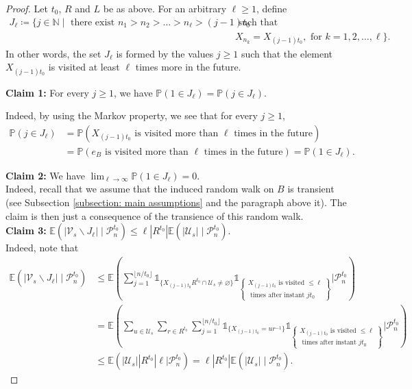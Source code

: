 \documentclass[reqno,oneside,11pt]{amsart}
\renewcommand{\P}{\mathbb{P}}
\newcommand{\E}{\mathbb{E}}
\theoremstyle{plain}
\theoremstyle{definition}
\begin{document}
\begin{proof}
	Let $t_0$, $R$ and $L$ be as above.	For an arbitrary $\ell \ge 1$, define 
	\begin{align*}
		J_{\ell}\coloneqq \{j\in \mathbb{N}\mid \text{ there exist }n_1>n_2>\ldots> n_\ell>(j-1)t_0 &\text{ such that }\\
		&X_{n_k}=X_{(j-1)t_0}, \text{ for }k=1,2,\ldots,\ell \}.
	\end{align*}
	In other words, the set $J_{\ell}$ is formed by the values $j\ge 1$ such that the element $X_{(j-1)t_0}$ is visited at least $\ell$ times more in the future.
	
	\textbf{Claim 1:} For every $j\ge 1$, we have  $\P(1\in J_\ell)=\P(j\in J_\ell)$.
	
	Indeed, by using the Markov property, we see that for every $j\ge 1$,
	\begin{align*}
		\P(j\in J_\ell)&=\P(X_{(j-1)t_0} \text{ is visited more than }\ell \text{ times in the future})\\
		&=\P(e_B \text{ is visited more than }\ell \text{ times in the future})=\P(1\in J_{\ell}).
	\end{align*}
	
	\textbf{Claim 2:} We have $\lim_{\ell \to \infty}\P(1\in J_\ell)=0.$\\
	Indeed, recall that we assume that the induced random walk on $B$ is transient (see Subsection \ref{subsection: main assumptions} and the paragraph above it). The claim is then just a consequence of the transience of this random walk. \\
	
	\textbf{Claim 3:} $\E(|\mathcal{V}_s\backslash J_\ell|\mid \mathcal{P}_n^{t_0})\le \ell |R^{t_0}| \E(|\mathcal{U}_s|\mid \mathcal{P}_n^{t_0})$.\\
	Indeed, note that
	\begin{align*}
		\E\left( |\mathcal{V}_s\backslash J_\ell|\mid \mathcal{P}_n^{t_0} \right)&\le\E\left( \sum_{j=1}^{\lfloor n/t_0\rfloor}\mathds{1}_{\{X_{(j-1)t_0}R^{t_0}\cap \mathcal{U}_s\neq \varnothing\}}\mathds{1}_{\left\{\substack{ X_{(j-1)t_0}\text{ is visited }\le \ell \\ \text{ times after instant }jt_0} \right\} }\Big| \mathcal{P}_n^{t_0} \right)\\
		&=\E\left(\sum_{u\in \mathcal{U}_s}\sum_{r\in R^{t_0}} \sum_{j=1}^{\lfloor n/t_0\rfloor}\mathds{1}_{\{X_{(j-1)t_0}=ur^{-1}\}}\mathds{1}_{\left\{\substack{ X_{(j-1)t_0}\text{ is visited }\le \ell \\ \text{ times after instant }jt_0} \right\} }\Big| \mathcal{P}_n^{t_0} \right)\\
		&\le\E\left(|\mathcal{U}_s| |R^{t_0}|\ell\Big| \mathcal{P}_n^{t_0} \right)=\ell |R^{t_0}| \E(|\mathcal{U}_s|\mid \mathcal{P}_n^{t_0}).
	\end{align*}
	

\end{proof}
\end{document}
